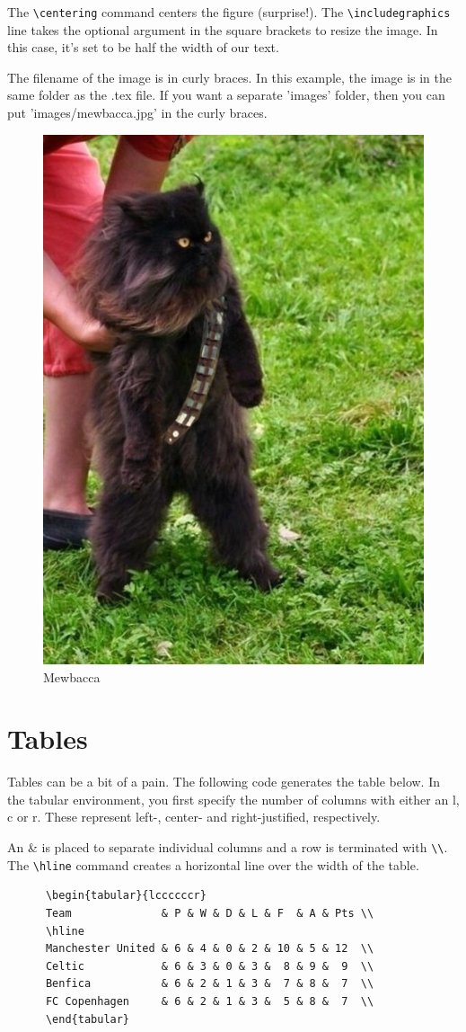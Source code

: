 \documentclass[12pt,a4paper]{article}
\begin{document}
    The \verb|\centering| command centers the figure (surprise!).  
    The \verb|\includegraphics| line takes the optional argument in the
    square brackets to resize the image.  In this case, it's set to be
    half the width of our text.  

    The filename of the image is in curly braces.  In this example, the
    image is in the same folder as the .tex file.  If you want a
    separate 'images' folder, then you can put 'images/mewbacca.jpg'
    in the curly braces.
    \begin{figure}[H]
      \centering
      \includegraphics[width=.5\textwidth]{mewbacca.jpg}
      \caption{Mewbacca \label{fig:mewbacca}}
    \end{figure}

  \section{Tables}
    Tables can be a bit of a pain. The following code generates the
    table below.  In the tabular environment, you first specify the
    number of columns with either an l, c or r.  These represent left-,
    center- and right-justified, respectively.  

    An \& is placed to separate individual columns and a row is
    terminated with \verb|\\|.  The \verb|\hline| command creates a
    horizontal line over the width of the table.  
    \begin{verbatim}
      \begin{tabular}{lccccccr}
      Team              & P & W & D & L & F  & A & Pts \\
      \hline
      Manchester United & 6 & 4 & 0 & 2 & 10 & 5 & 12  \\
      Celtic            & 6 & 3 & 0 & 3 &  8 & 9 &  9  \\
      Benfica           & 6 & 2 & 1 & 3 &  7 & 8 &  7  \\
      FC Copenhagen     & 6 & 2 & 1 & 3 &  5 & 8 &  7  \\
      \end{tabular}
    \end{verbatim}
    
\end{document}

